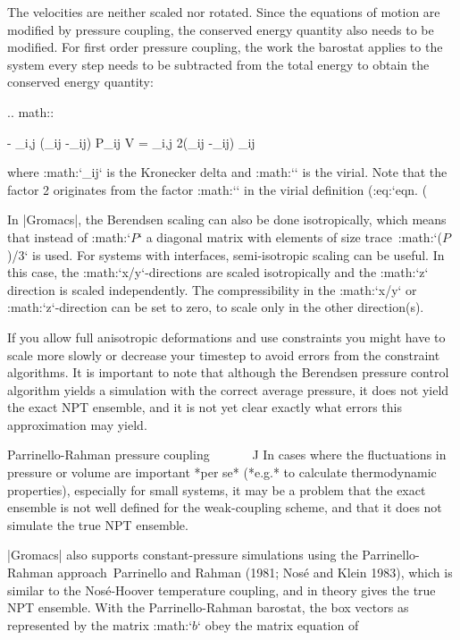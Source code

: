 The velocities are neither scaled nor rotated. Since the equations of
motion are modified by pressure coupling, the conserved energy quantity
also needs to be modified. For first order pressure coupling, the work
the barostat applies to the system every step needs to be subtracted
from the total energy to obtain the conserved energy quantity:

.. math::

   - \sum_{i,j} (\mu_{ij} -\delta_{ij}) P_{ij} V =
   \sum_{i,j} 2(\mu_{ij} -\delta_{ij}) \Xi_{ij}

where :math:`\delta_{ij}` is the Kronecker delta and :math:`{\bf \Xi}`
is the virial. Note that the factor 2 originates from the factor
:math:`` in the virial definition
(:eq:`eqn. (%

In |Gromacs|, the Berendsen scaling can also be done isotropically, which
means that instead of :math:`{\mbox{\boldmath ${P}$}}` a diagonal matrix
with elements of size trace\ :math:`({\mbox{\boldmath ${P}$}})/3` is
used. For systems with interfaces, semi-isotropic scaling can be useful.
In this case, the :math:`x/y`-directions are scaled isotropically and
the :math:`z` direction is scaled independently. The compressibility in
the :math:`x/y` or :math:`z`-direction can be set to zero, to scale only
in the other direction(s).

If you allow full anisotropic deformations and use constraints you might
have to scale more slowly or decrease your timestep to avoid errors from
the constraint algorithms. It is important to note that although the
Berendsen pressure control algorithm yields a simulation with the
correct average pressure, it does not yield the exact NPT ensemble, and
it is not yet clear exactly what errors this approximation may yield.

Parrinello-Rahman pressure coupling
^^^^^^^^^^^^^^^^^^^^^^^^^^^^^^^^^^^

In cases where the fluctuations in pressure or volume are important *per
se* (*e.g.* to calculate thermodynamic properties), especially for small
systems, it may be a problem that the exact ensemble is not well defined
for the weak-coupling scheme, and that it does not simulate the true NPT
ensemble.

|Gromacs| also supports constant-pressure simulations using the
Parrinello-Rahman approach Parrinello and Rahman (1981; Nosé and Klein
1983), which is similar to the Nosé-Hoover temperature coupling, and in
theory gives the true NPT ensemble. With the Parrinello-Rahman barostat,
the box vectors as represented by the matrix
:math:`{\mbox{\boldmath ${b}$}}` obey the matrix equation of


